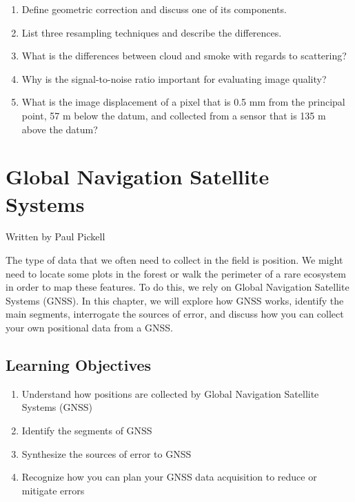 \documentclass[
]{book}
\providecommand{\tightlist}{%
  \setlength{\itemsep}{0pt}\setlength{\parskip}{0pt}}
\begin{document}
\begin{enumerate}
\def\labelenumi{\arabic{enumi}.}
\tightlist
\item
  Define geometric correction and discuss one of its components.
\item
  List three resampling techniques and describe the differences.
\item
  What is the differences between cloud and smoke with regards to scattering?
\item
  Why is the signal-to-noise ratio important for evaluating image quality?
\item
  What is the image displacement of a pixel that is 0.5 mm from the principal point, 57 m below the datum, and collected from a sensor that is 135 m above the datum?
\end{enumerate}

\chapter{Global Navigation Satellite Systems}\label{global-navigation-satellite-systems}

Written by
Paul Pickell

The type of data that we often need to collect in the field is position. We might need to locate some plots in the forest or walk the perimeter of a rare ecosystem in order to map these features. To do this, we rely on Global Navigation Satellite Systems (GNSS). In this chapter, we will explore how GNSS works, identify the main segments, interrogate the sources of error, and discuss how you can collect your own positional data from a GNSS.

\section*{Learning Objectives}\label{learning-objectives-11}

\begin{enumerate}
\def\labelenumi{\arabic{enumi}.}
\tightlist
\item
  Understand how positions are collected by Global Navigation Satellite Systems (GNSS)
\item
  Identify the segments of GNSS
\item
  Synthesize the sources of error to GNSS
\item
  Recognize how you can plan your GNSS data acquisition to reduce or mitigate errors
\end{enumerate}
\end{document}
